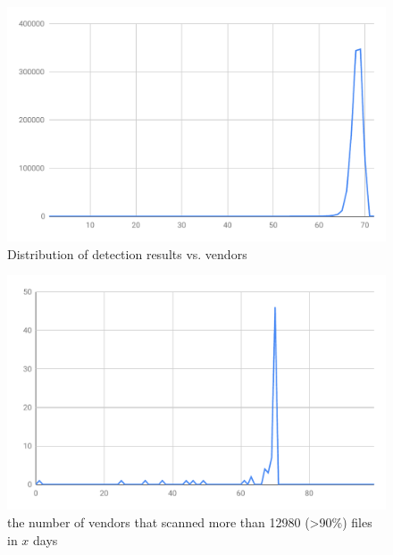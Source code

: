 \begin{figure}
\centering
\includegraphics[width=0.7\linewidth]{figure/dataset_submission_vendor_distri}
\caption{Distribution of detection results vs. vendors}
\label{fig:dataset_submission_vendor_distri}
\end{figure}

\begin{figure}
\centering
\includegraphics[width=0.7\linewidth]{figure/dataset_no_vendors_scanned_moste_files_in_x_days}
\caption{the number of vendors that scanned more than 12980 (>90\%) files in $x$ days}
\label{fig:dataset_no_vendors_scanned_moste_files_in_x_days}
\end{figure}
